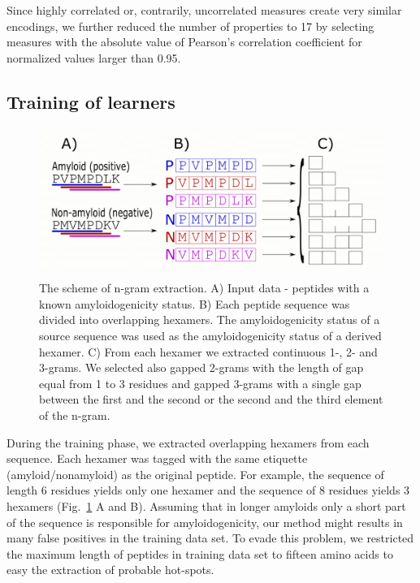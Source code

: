 \documentclass{bioinfo}
\begin{document}
\begin{methods}
  Since highly correlated or, contrarily, uncorrelated measures create very 
similar encodings, we further reduced the number of properties to 17 by 
selecting measures with the absolute value of Pearson's correlation coefficient 
for normalized values larger than 0.95.

\subsection{Training of learners}

\begin{figure}[!tpb]%
\centerline{\includegraphics[width=\textwidth]{figures/ngram_scheme.png}}
  \caption{The scheme of n-gram extraction. A) Input data - peptides with a 
known amyloidogenicity status. B) Each peptide sequence was divided into 
overlapping hexamers. The amyloidogenicity status of a source sequence was used 
as the amyloidogenicity status of a derived hexamer. C) From each hexamer we 
extracted continuous 1-, 2- and 3-grams. We selected also gapped 2-grams with 
the length of gap equal from 1 to 3 residues and gapped 3-grams with a single 
gap between the first and the second or the second and the third element of the 
n-gram.}
\label{fig:ngram_scheme}
\end{figure}

During the training phase, we extracted overlapping hexamers from each sequence. 
Each hexamer was tagged with the same etiquette (amyloid/nonamyloid) as the 
original peptide. For example, the sequence of length 6 residues yields only one 
hexamer and the sequence of 8 residues yields 3 hexamers 
(Fig.~\ref{fig:ngram_scheme} A and B).  Assuming that in longer amyloids only a 
short part of the sequence is responsible for amyloidogenicity, our method might 
results in many false positives in the training data set. To evade this problem, 
we restricted the maximum length of peptides in training data set to fifteen 
amino acids to easy the extraction of probable hot-spots.


\end{methods}
\end{document}
